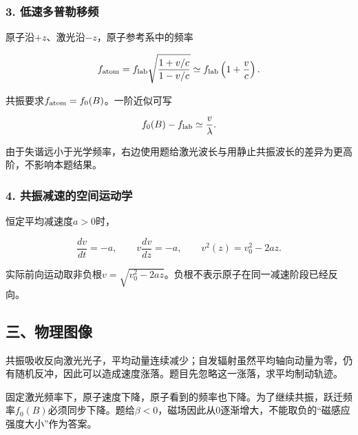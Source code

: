 \documentclass[12pt,a4paper,fontset=fandol]{ctexart}
\begin{document}
\subsubsection{3.
低速多普勒移频}\label{ux4f4eux901fux591aux666eux52d2ux79fbux9891}

原子沿\(+z\)、激光沿\(-z\)，原子参考系中的频率

\[
f_{\rm atom}=f_{\rm lab}\sqrt{\frac{1+v/c}{1-v/c}}
\simeq f_{\rm lab}\left(1+\frac vc\right).
\]

共振要求\(f_{\rm atom}=f_0(B)\)。一阶近似可写

\[
f_0(B)-f_{\rm lab}\simeq\frac v\lambda.
\]

由于失谐远小于光学频率，右边使用题给激光波长与用静止共振波长的差异为更高阶，不影响本题结果。

\subsubsection{4.
共振减速的空间运动学}\label{ux5171ux632fux51cfux901fux7684ux7a7aux95f4ux8fd0ux52a8ux5b66}

恒定平均减速度\(a>0\)时，

\[
\frac{dv}{dt}=-a,\qquad
v\frac{dv}{dz}=-a,
\qquad v^2(z)=v_0^2-2az.
\]

实际前向运动取非负根\(v=\sqrt{v_0^2-2az}\)。负根不表示原子在同一减速阶段已经反向。

\subsection{三、物理图像}\label{ux4e09ux7269ux7406ux56feux50cf-4}

共振吸收反向激光光子，平均动量连续减少；自发辐射虽然平均轴向动量为零，仍有随机反冲，因此可以造成速度涨落。题目先忽略这一涨落，求平均制动轨迹。

固定激光频率下，原子速度下降，原子看到的频率也下降。为了继续共振，跃迁频率\(f_0(B)\)必须同步下降。题给\(\beta<0\)，磁场因此从0逐渐增大，不能取负的``磁感应强度大小''作为答案。

\begin{center}
\begin{minipage}{\linewidth}
\centering\begingroup{}
\ifdim\wd\diagrambox>.88\linewidth
\sbox{\diagrambox}{\resizebox{.88\linewidth}{!}{\usebox{\diagrambox}}}\fi
\ifdim\ht\diagrambox>.38\textheight
\resizebox{!}{.38\textheight}{\usebox{\diagrambox}}
\else\usebox{\diagrambox}\fi
\par{}\endgroup\end{minipage}\end{center}
\end{document}
